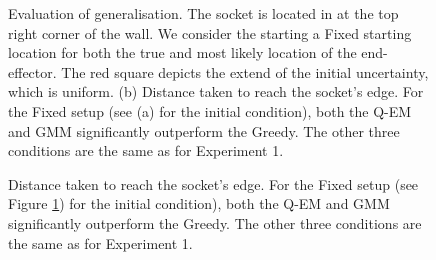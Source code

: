 \begin{figure}
 \centering
    \caption{Evaluation of generalisation. The socket is located in at the top right corner of the wall. We consider the 
    starting a Fixed starting location for both the true and most likely location of the end-effector. The red square depicts the 
    extend of the initial uncertainty, which is uniform. (b) Distance taken to reach the socket's edge. For the Fixed setup (see (a) for 
    the initial condition), both the Q-EM and GMM significantly outperform the Greedy. The other three conditions are the same as for 
    Experiment 1. }
    \label{fig:experiment5_traj}
\end{figure}

\begin{figure}
 \centering
    \caption{Distance taken to reach the socket's edge. For the Fixed setup (see Figure \ref{fig:experiment5_traj}) for 
    the initial condition), both the Q-EM and GMM significantly outperform the Greedy. The other three conditions are the same as for 
    Experiment 1. }
    \label{fig:experiment5_stats}
\end{figure}

